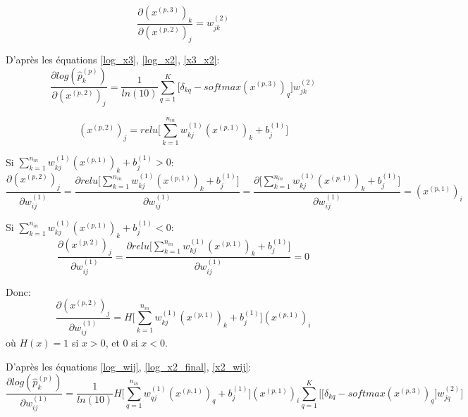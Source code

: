 \documentclass[a4paper,11pt,oneside,roman]{article}
\begin{document}
    \begin{equation}
        \frac{\partial (x^{(p,3)})_k}{\partial (x^{(p,2)})_j} = w_{jk}^{(2)}
        \label{x3_x2}
    \end{equation}
    
    D'après les équations \eqref{log_x3}, \eqref{log_x2}, \eqref{x3_x2}:
    \begin{equation}
        \frac{\partial log(\hat{p}_{k}^{(p)})}{\partial (x^{(p,2)})_j} = \frac{1}{ln(10)} \sum\limits_{q=1}^{K} \bigg[ \delta_{kq} - softmax(x^{(p,3)})_q \bigg] w_{jk}^{(2)}
        \label{log_x2_final}
    \end{equation}
    
    \begin{equation}
        (x^{(p,2)})_{j} = relu\bigg[\sum\limits_{k=1}^{n_{in}} w_{kj}^{(1)}(x^{(p,1)})_{k} + b_j^{(1)}\bigg]
    \end{equation}
    
    Si $\sum\limits_{k=1}^{n_{in}} w_{kj}^{(1)}(x^{(p,1)})_{k} + b_j^{(1)} > 0$:
    \begin{equation}
        \frac{\partial (x^{(p,2)})_j}{\partial w_{ij}^{(1)}} = \frac{\partial relu\bigg[\sum\limits_{k=1}^{n_{in}} w_{kj}^{(1)}(x^{(p,1)})_{k} + b_j^{(1)}\bigg]}{\partial w_{ij}^{(1)}} = \frac{\partial \bigg[\sum\limits_{k=1}^{n_{in}} w_{kj}^{(1)}(x^{(p,1)})_{k} + b_j^{(1)}\bigg]}{\partial w_{ij}^{(1)}} = (x^{(p,1)})_i
    \end{equation}
    
    Si $\sum\limits_{k=1}^{n_{in}} w_{kj}^{(1)}(x^{(p,1)})_{k} + b_j^{(1)} < 0$:
    \begin{equation}
        \frac{\partial (x^{(p,2)})_j}{\partial w_{ij}^{(1)}} = \frac{\partial relu\bigg[\sum\limits_{k=1}^{n_{in}} w_{kj}^{(1)}(x^{(p,1)})_{k} + b_j^{(1)}\bigg]}{\partial w_{ij}^{(1)}} = 0
    \end{equation}
    
    Donc:
    \begin{equation}
        \frac{\partial (x^{(p,2)})_j}{\partial w_{ij}^{(1)}} = H\bigg[\sum\limits_{k=1}^{n_{in}} w_{kj}^{(1)}(x^{(p,1)})_{k} + b_j^{(1)}\bigg](x^{(p,1)})_i
        \label{x2_wij}
    \end{equation}
    où $H(x) = 1$ si $x>0$, et $0$ si $x<0$.

    D'après les équations \eqref{log_wij}, \eqref{log_x2_final}, \eqref{x2_wij}:
    \begin{equation}
        \frac{\partial log(\hat{p}_{k}^{(p)})}{\partial w_{ij}^{(1)}} = \frac{1}{ln(10)} H\bigg[\sum\limits_{q=1}^{n_{in}} w_{qj}^{(1)}(x^{(p,1)})_{q} + b_j^{(1)}\bigg](x^{(p,1)})_i \sum\limits_{q=1}^{K} \bigg[\big[ \delta_{kq} - softmax(x^{(p,3)})_q \big] w_{jq}^{(2)} \bigg] 
        \label{log_wij_final}
    \end{equation}
\end{document}

